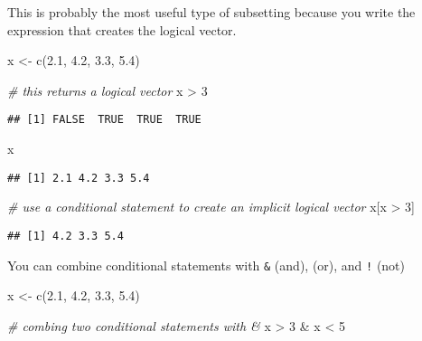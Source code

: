 \documentclass[
]{book}
\newenvironment{Shaded}{\begin{snugshade}}{\end{snugshade}}
\newcommand{\CommentTok}[1]{\textcolor[rgb]{0.56,0.35,0.01}{\textit{#1}}}
\newcommand{\DecValTok}[1]{\textcolor[rgb]{0.00,0.00,0.81}{#1}}
\newcommand{\FloatTok}[1]{\textcolor[rgb]{0.00,0.00,0.81}{#1}}
\newcommand{\FunctionTok}[1]{\textcolor[rgb]{0.00,0.00,0.00}{#1}}
\newcommand{\NormalTok}[1]{#1}
\newcommand{\OtherTok}[1]{\textcolor[rgb]{0.56,0.35,0.01}{#1}}
\newcommand{\SpecialCharTok}[1]{\textcolor[rgb]{0.00,0.00,0.00}{#1}}
\begin{document}
This is probably the most useful type of subsetting because you write the expression that creates the logical vector.

\begin{Shaded}
\begin{Highlighting}[]
\NormalTok{x }\OtherTok{\textless{}{-}} \FunctionTok{c}\NormalTok{(}\FloatTok{2.1}\NormalTok{, }\FloatTok{4.2}\NormalTok{, }\FloatTok{3.3}\NormalTok{, }\FloatTok{5.4}\NormalTok{)}

\CommentTok{\# this returns a logical vector}
\NormalTok{x }\SpecialCharTok{\textgreater{}} \DecValTok{3}
\end{Highlighting}
\end{Shaded}

\begin{verbatim}
## [1] FALSE  TRUE  TRUE  TRUE
\end{verbatim}

\begin{Shaded}
\begin{Highlighting}[]
\NormalTok{x}
\end{Highlighting}
\end{Shaded}

\begin{verbatim}
## [1] 2.1 4.2 3.3 5.4
\end{verbatim}

\begin{Shaded}
\begin{Highlighting}[]
\CommentTok{\# use a conditional statement to create an implicit logical vector}
\NormalTok{x[x }\SpecialCharTok{\textgreater{}} \DecValTok{3}\NormalTok{]}
\end{Highlighting}
\end{Shaded}

\begin{verbatim}
## [1] 4.2 3.3 5.4
\end{verbatim}

You can combine conditional statements with \texttt{\&} (and), \texttt{\textbar{}} (or), and \texttt{!} (not)

\begin{Shaded}
\begin{Highlighting}[]
\NormalTok{x }\OtherTok{\textless{}{-}} \FunctionTok{c}\NormalTok{(}\FloatTok{2.1}\NormalTok{, }\FloatTok{4.2}\NormalTok{, }\FloatTok{3.3}\NormalTok{, }\FloatTok{5.4}\NormalTok{)}

\CommentTok{\# combing two conditional statements with \&}
\NormalTok{x }\SpecialCharTok{\textgreater{}} \DecValTok{3} \SpecialCharTok{\&}\NormalTok{ x }\SpecialCharTok{\textless{}} \DecValTok{5}
\end{Highlighting}
\end{Shaded}
\end{document}
